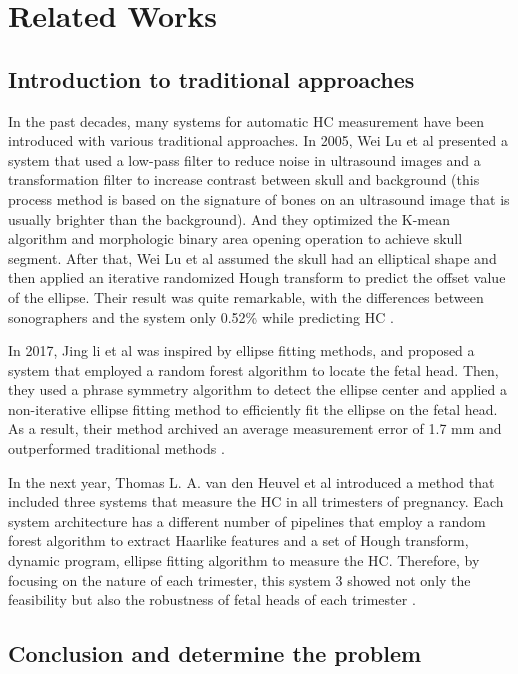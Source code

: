 \chapter{Related Works}
\section{Introduction to traditional approaches}
\label{section:traditional_approaches}
\noindent

	In the past decades, many systems for automatic HC measurement have been introduced with various traditional approaches. In 2005, Wei Lu et al presented a system that used a low-pass filter to reduce noise in ultrasound images and a transformation filter to increase contrast between skull and background (this process method is based on the signature of bones on an ultrasound image that is usually brighter than the background). And they optimized the K-mean algorithm and morphologic binary area opening operation to achieve skull segment. After that, Wei Lu et al assumed the skull had an elliptical shape and then applied an iterative randomized Hough transform to predict the offset value of the ellipse. Their result was quite remarkable, with the differences between sonographers and the system only 0.52\% while predicting HC \cite{lu}.
	
	In 2017, Jing li et al was inspired by ellipse fitting methods, and proposed a system that employed a random forest algorithm to locate the fetal head. Then, they used a phrase symmetry algorithm to detect the ellipse center and applied a non-iterative ellipse fitting method to efficiently fit the ellipse on the fetal head. As a result, their method archived an average measurement error of 1.7 mm and outperformed traditional methods \cite{li}.
	
	In the next year, Thomas L. A. van den Heuvel et al introduced a method that included three systems that measure the HC in all trimesters of pregnancy. Each system architecture has a different number of pipelines that employ a random forest algorithm to extract Haarlike features and a set of Hough transform, dynamic program, ellipse fitting algorithm to measure the HC. Therefore, by focusing on the nature of each trimester, this system 3 showed not only the feasibility but also the robustness of fetal heads of each trimester \cite{thomas}.
	

\section{Conclusion and determine the problem}
\label{section:determine_problem}
\noindent
	
